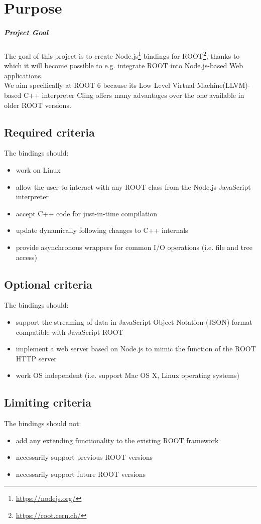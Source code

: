 \chapter{Purpose}
\paragraph{Project Goal}
The goal of this project is to create Node.js\textsuperscript{\textregistered}\footnote{\url{https://nodejs.org/}} bindings for
ROOT\footnote{\url{https://root.cern.ch/}}, thanks to which it will become possible to e.g. integrate ROOT into Node.js-based Web applications.\\
We aim specifically at ROOT 6 because its Low Level Virtual Machine(LLVM)-based C++ interpreter Cling offers many advantages over the one available in older ROOT versions.
\section{Required criteria}
The bindings should:
\begin{itemize}
	\item work on Linux
	\item allow the user to interact with any ROOT class from the Node.js JavaScript interpreter
	\item accept C++ code for just-in-time compilation
	\item update dynamically following changes to C++ internals
	\item provide asynchronous wrappers for common I/O operations (i.e. file and tree access)
\end{itemize}

\section{Optional criteria}
The bindings should:
\begin{itemize}
	\item support the streaming of data in JavaScript Object Notation (JSON) format compatible with JavaScript ROOT
	\item implement a web server based on Node.js to mimic the function of the ROOT HTTP server
	\item work OS independent (i.e. support Mac OS X, Linux operating systems)
\end{itemize}

\section{Limiting criteria}
The bindings should not:
\begin{itemize}
	\item add any extending functionality to the existing ROOT framework
	\item necessarily support previous ROOT versions
	\item necessarily support future ROOT versions
\end{itemize}
